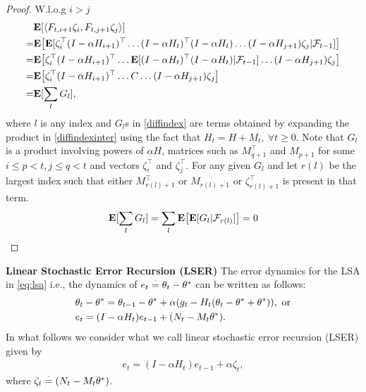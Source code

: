 \begin{proof}
W.l.o.g  $i>j$
\begin{align}
&\mathbf{E}[\langle F_{t,i+1} \zeta_{i},F_{t,j+1} \zeta_{j}\rangle]\nonumber\\
\label{diffindexinter}=&\mathbf{E}\big[\mathbf{E}[ \zeta^\top_{i}(I-\alpha H_{i+1})^\top\ldots(I-\alpha H_t)^\top(I-\alpha H_t)\ldots(I-\alpha H_{j+1}) \zeta_{j}|\mathcal{F}_{t-1}]\big]\\
=&\mathbf{E}\big[ \zeta^\top_{i}(I-\alpha H_{i+1})^\top\ldots\mathbf{E}[(I-\alpha H_t)^\top(I-\alpha H_t)|\mathcal{F}_{t-1}]\ldots(I-\alpha H_{j+1}) \zeta_{j}\big]\\
=&\mathbf{E}\big[ \zeta^\top_{i}(I-\alpha H_{i+1})^\top\ldots C\ldots(I-\alpha H_{j+1}) \zeta_{j}\big]\\
\label{diffindex}=&\mathbf{E}[ \sum_{l} G_l],
\end{align}
where $l$ is any index and $G_l$s in \eqref{diffindex} are terms obtained by expanding the product in \eqref{diffindexinter} using the fact that $H_t=H+M_{t},~\forall t\geq 0$. Note that $G_l$ is a product involving powers of $\alpha H$, matrices such as $M^\top_{q+1}$ and $M_{p+1}$ for some $ i\leq p<t, j\leq q < t$ and vectors $\zeta^\top_i$ and $\zeta^\top_j$.
For any given $G_l$ and let $r(l)$ be the largest index such that either $M^\top_{r(l)+1}$ or $M_{r(l)+1}$ or $\zeta^\top_{r(l)+1}$ is present in that term.
\begin{align*}
\mathbf{E}[ \sum_{l} G_l]=  \sum_{l} \mathbf{E}\big[\mathbf{E}[G_l|\mathcal{F}_{r(l)}]\big]=0
\end{align*}
\end{proof}



\textbf{Linear Stochastic Error Recursion (LSER)} The error dynamics for the LSA in \eqref{eq:lsa} i.e., the dynamics of $e_t\stackrel{\cdot}{=}\theta_t-\theta^*$ can be written as follows:
\begin{align}\label{errprelim}
&\theta_t-\theta^*=\theta_{t-1}-\theta^*+\alpha(g_t -H_t(\theta_t-\theta^*+\theta^*)),\text{~or}\nonumber\\
&e_t=(I-\alpha H_t)e_{t-1}+(N_t-M_t\theta^*).
\end{align}
In what follows we consider what we call linear stochastic error recursion (LSER) given by
\begin{align}\label{lsergen}
e_t=(I-\alpha H_t)e_{t-1}+\alpha \zeta_t,
\end{align}
where $\zeta_t\stackrel{\cdot}{=} (N_t-M_t\theta^*)$.
